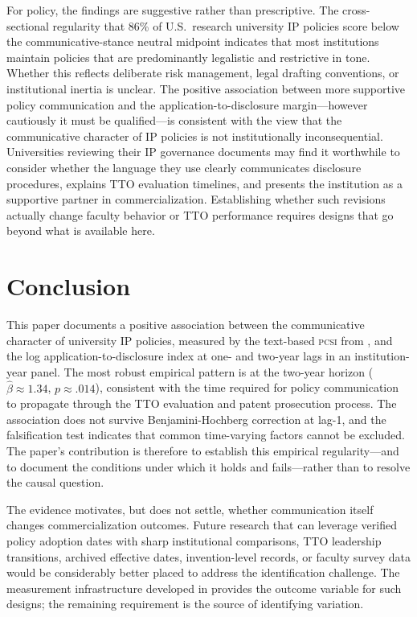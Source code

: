 \documentclass[12pt]{article}
\newcommand{\PCSI}{\textsc{pcsi}}
\begin{document}
For policy, the findings are suggestive rather than prescriptive. The cross-sectional
regularity that 86\% of U.S.\ research university IP policies score below the
communicative-stance neutral midpoint indicates that most institutions maintain policies
that are predominantly legalistic and restrictive in tone. Whether this reflects deliberate
risk management, legal drafting conventions, or institutional inertia is unclear. The
positive association between more supportive policy communication and the application-to-disclosure
margin---however cautiously it must be qualified---is consistent with the view that the
communicative character of IP policies is not institutionally inconsequential. Universities
reviewing their IP governance documents may find it worthwhile to consider whether the
language they use clearly communicates disclosure procedures, explains TTO evaluation
timelines, and presents the institution as a supportive partner in commercialization.
Establishing whether such revisions actually change faculty behavior or TTO performance
requires designs that go beyond what is available here.

\section{Conclusion}
\label{sec:conclusion}

This paper documents a positive association between the communicative character of
university IP policies, measured by the text-based \PCSI{} from \citet{sharma2026pcsi},
and the log application-to-disclosure index at one- and two-year lags in an institution-year
panel. The most robust empirical pattern is at the two-year horizon ($\hat\beta \approx 1.34$,
$p \approx .014$), consistent with the time required for policy communication to propagate
through the TTO evaluation and patent prosecution process. The association does not
survive Benjamini-Hochberg correction at lag-1, and the falsification test indicates
that common time-varying factors cannot be excluded. The paper's contribution is
therefore to establish this empirical regularity---and to document the conditions under
which it holds and fails---rather than to resolve the causal question.

The evidence motivates, but does not settle, whether communication itself changes
commercialization outcomes. Future research that can leverage verified policy adoption
dates with sharp institutional comparisons, TTO leadership transitions, archived effective
dates, invention-level records, or faculty survey data would be considerably better
placed to address the identification challenge. The measurement infrastructure developed
in \citet{sharma2026pcsi} provides the outcome variable for such designs; the remaining
requirement is the source of identifying variation.
\end{document}
